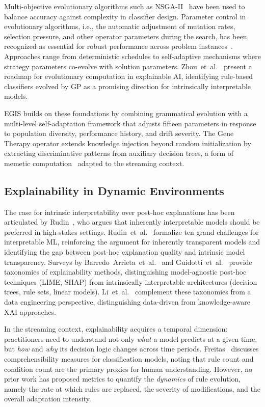\documentclass[lettersize,journal]{IEEEtran}
\begin{document}
Multi-objective evolutionary algorithms such as NSGA-II~\cite{deb2002nsga} have been used to balance accuracy against complexity in classifier design. Parameter control in evolutionary algorithms, i.e., the automatic adjustment of mutation rates, selection pressure, and other operator parameters during the search, has been recognized as essential for robust performance across problem instances~\cite{eiben1999parameter}. Approaches range from deterministic schedules to self-adaptive mechanisms where strategy parameters co-evolve with solution parameters. Zhou~et~al.~\cite{zhou2025ecxai} present a roadmap for evolutionary computation in explainable AI, identifying rule-based classifiers evolved by GP as a promising direction for intrinsically interpretable models.

EGIS builds on these foundations by combining grammatical evolution with a multi-level self-adaptation framework that adjusts fifteen parameters in response to population diversity, performance history, and drift severity. The Gene Therapy operator extends knowledge injection beyond random initialization by extracting discriminative patterns from auxiliary decision trees, a form of memetic computation~\cite{espejo2010gp} adapted to the streaming context.

\subsection{Explainability in Dynamic Environments}

The case for intrinsic interpretability over post-hoc explanations has been articulated by Rudin~\cite{rudin2019stop}, who argues that inherently interpretable models should be preferred in high-stakes settings. Rudin~et~al.~\cite{rudin2022interpretable} formalize ten grand challenges for interpretable ML, reinforcing the argument for inherently transparent models and identifying the gap between post-hoc explanation quality and intrinsic model transparency. Surveys by Barredo~Arrieta~et~al.~\cite{barredo2020xai} and Guidotti~et~al.~\cite{guidotti2018blackbox} provide taxonomies of explainability methods, distinguishing model-agnostic post-hoc techniques (LIME, SHAP) from intrinsically interpretable architectures (decision trees, rule sets, linear models). Li~et~al.~\cite{li2022xai} complement these taxonomies from a data engineering perspective, distinguishing data-driven from knowledge-aware XAI approaches.

In the streaming context, explainability acquires a temporal dimension: practitioners need to understand not only \emph{what} a model predicts at a given time, but \emph{how} and \emph{why} its decision logic changes across time periods. Freitas~\cite{freitas2014comprehensible} discusses comprehensibility measures for classification models, noting that rule count and condition count are the primary proxies for human understanding. However, no prior work has proposed metrics to quantify the \emph{dynamics} of rule evolution, namely the rate at which rules are replaced, the severity of modifications, and the overall adaptation intensity.
\end{document}

